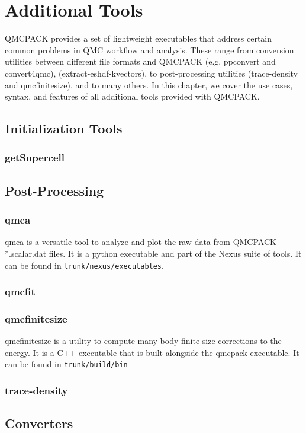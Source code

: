 \chapter{Additional Tools}
\label{chap:additional_tools}
QMCPACK provides a set of lightweight executables that address certain
common problems in QMC workflow and analysis.  These range from conversion utilities between 
different file formats and QMCPACK (e.g. ppconvert and convert4qmc),  
(extract-eshdf-kvectors), to post-processing utilities (trace-density and qmcfinitesize), and to many others.  In this chapter, we cover the use cases, syntax, and features of all additional tools provided with QMCPACK.  

\section{Initialization Tools}
  \subsection{getSupercell}

\section{Post-Processing}
  \subsection{qmca}
    qmca is a versatile tool to analyze and plot the raw data from QMCPACK *.scalar.dat files.
    It is a python executable and part of the Nexus suite of tools.  It can be found in 
    \texttt{trunk/nexus/executables}. 
  \subsection{qmcfit}
  \subsection{qmcfinitesize}
    qmcfinitesize is a utility to compute many-body finite-size corrections to the energy.  It
    is a C++ executable that is built alongside the qmcpack executable.  It can be found in 
    \texttt{trunk/build/bin}
  \subsection{trace-density}

\section{Converters} 

